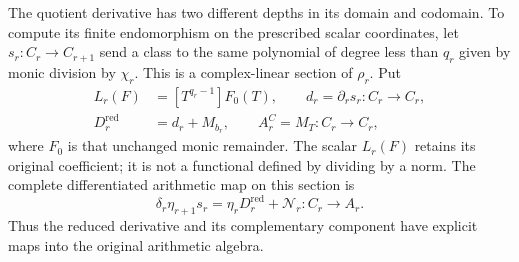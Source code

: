 The quotient derivative has two different depths in its domain and
codomain.  To compute its finite endomorphism on the prescribed scalar
coordinates, let
\(s_r:C_r\to C_{r+1}\) send a class to the same polynomial of degree
less than \(q_r\) given by monic division by \(\chi_r\).
This is a complex-linear section of \(\rho_r\).  Put
\[
 \begin{aligned}
 L_r(F)&=[T^{q_r-1}]F_0(T),\qquad
 d_r=\partial_rs_r:C_r\to C_r,\\
 D_r^{\mathrm{red}}&=d_r+M_{b_r},\qquad
 A_r^C=M_T:C_r\to C_r,
 \end{aligned}\tag{CC.25}
\]
where \(F_0\) is that unchanged monic remainder.  The scalar
\(L_r(F)\) retains its original coefficient; it is not a functional
defined by dividing by a norm.  The complete differentiated arithmetic
map on this section is
\[
 \delta_r\eta_{r+1}s_r
   =\eta_rD_r^{\mathrm{red}}+\mathcal N_r:C_r\longrightarrow A_r.
 \tag{CC.26}
\]
Thus the reduced derivative and its complementary component have
explicit maps into the original arithmetic algebra.


